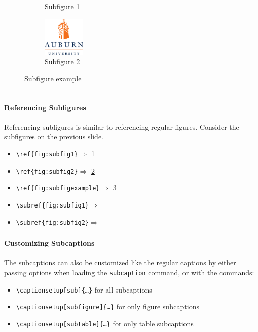 \documentclass[article]{beamer}
\begin{document}
\begin{frame}[fragile]
\begin{columns}
\begin{column}{0.5\textwidth}
\begin{figure}[]
\begin{subfigure}[b]{0.5\linewidth}
        \caption{Subfigure 1}
        \label{fig:subfig1}
      \end{subfigure}
      \begin{subfigure}[b]{0.5\linewidth}
        \centering
        \includegraphics[width=2cm]{aulogo.pdf}
        \caption{Subfigure 2}
        \label{fig:subfig2}
      \end{subfigure}
      \caption{Subfigure example}
      \label{fig:subfigexample}
      \end{figure}
    \end{column}
  \end{columns}
\end{frame}

\begin{frame}
  \frametitle{\thesubsection}
  \framesubtitle{Referencing Subfigures}
  Referencing subfigures is similar to referencing regular
  figures.  Consider the subfigures on the previous slide.
  \begin{itemize}%
    \item  \texttt{\textbackslash ref\{fig:subfig1\}}$\Rightarrow$ \ref{fig:subfig1}
    \item  \texttt{\textbackslash ref\{fig:subfig2\}}$\Rightarrow$ \ref{fig:subfig2}
    \item  \texttt{\textbackslash ref\{fig:subfigexample\}}$\Rightarrow$
      \ref{fig:subfigexample}
    \item  \texttt{\textbackslash subref\{fig:subfig1\}}$\Rightarrow$ 
    \item  \texttt{\textbackslash subref\{fig:subfig2\}}$\Rightarrow$ 
  \end{itemize}  
\end{frame}

\begin{frame}
  \frametitle{\thesubsection}
  \framesubtitle{Customizing Subcaptions}
  The subcaptions can also be customized like the regular captions by either
  passing options when loading the \texttt{subcaption} command, or with the
  commands:
  \begin{itemize}%
    \item \texttt{\textbackslash captionsetup[sub]\{\ldots\}} for all
      subcaptions
    \item \texttt{\textbackslash captionsetup[subfigure]\{\ldots\}} for only
      figure subcaptions
    \item \texttt{\textbackslash captionsetup[subtable]\{\ldots\}} for only
      table subcaptions
  \end{itemize}
\end{frame}
\end{document}
